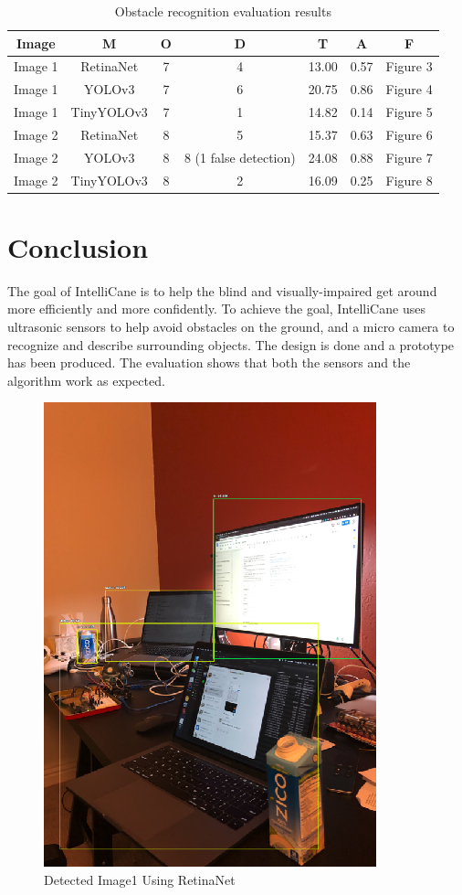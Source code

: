 


\begin{table}
  \caption{Obstacle recognition evaluation results} 
  \label{tab:freq}
  \begin{tabular}{ccccccc}
    \toprule
    Image & M & O & D & T & A & F \\
    \midrule
    Image 1 & RetinaNet & 7 & 4 & 13.00 & 0.57 & Figure 3 \\
    Image 1 & YOLOv3 & 7 & 6 & 20.75 & 0.86 & Figure 4 \\
    Image 1 & TinyYOLOv3 & 7 & 1 & 14.82 & 0.14 & Figure 5  \\
    Image 2 & RetinaNet & 8 & 5 & 15.37 & 0.63 & Figure 6  \\
    Image 2 & YOLOv3 & 8 & 8 (1 false detection) & 24.08 & 0.88 & Figure 7 \\
    Image 2 & TinyYOLOv3 & 8 & 2 & 16.09 & 0.25 & Figure 8 \\
  \bottomrule
\end{tabular}
\end{table}

\section{Conclusion}
The goal of IntelliCane is to help the blind and visually-impaired get around more efficiently and more confidently. To achieve the goal, IntelliCane uses ultrasonic sensors to help avoid obstacles on the ground, and a micro camera to recognize and describe surrounding objects. The design is done and a prototype has been produced. The evaluation shows that both the sensors and the algorithm work as expected.


\begin{figure}
  \includegraphics{figure3}
  \caption{Detected Image1 Using RetinaNet}
\end{figure}

